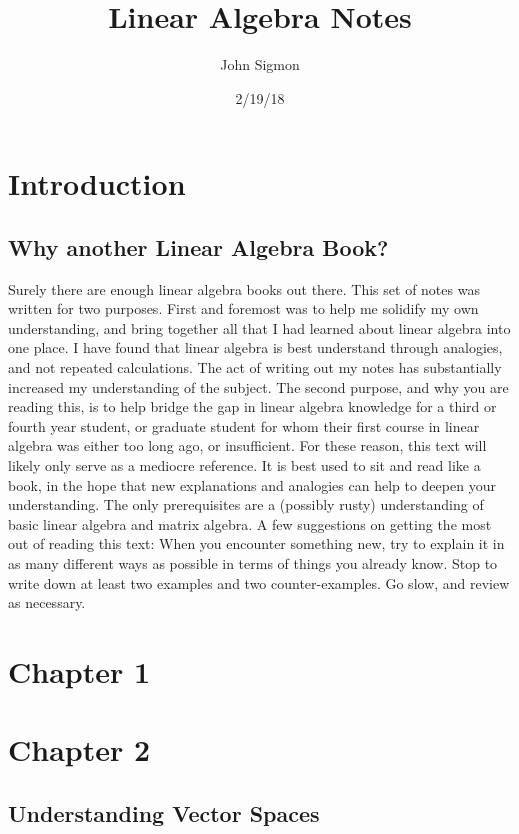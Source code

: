 \documentclass{book}
\title{Linear Algebra Notes}
\date{2/19/18}
\author{John Sigmon}
\begin{document}
\maketitle
	
\newpage
	
\tableofcontents

\chapter{Introduction}

\section{Why another Linear Algebra Book?}
		Surely there are enough linear algebra books out there. This set of notes was written for two purposes. First and foremost was to help me solidify my own understanding, and bring together all that I had learned about linear algebra into one place. I have found that linear algebra is best understand through analogies, and not repeated calculations. The act of writing out my notes has substantially increased my understanding of the subject. 
		The second purpose, and why you are reading this, is to help bridge the gap in linear algebra knowledge for a third or fourth year student, or graduate student for whom their first course in linear algebra was either too long ago, or insufficient. 
		For these reason, this text will likely only serve as a mediocre reference. It is best used to sit and read like a book, in the hope that new explanations and analogies can help to deepen your understanding. The only prerequisites are a (possibly rusty) understanding of basic linear algebra and matrix algebra.
		A few suggestions on getting the most out of reading this text:
		When you encounter something new, try to explain it in as many different ways as possible in terms of things you already know. 
		Stop to write down at least two examples and two counter-examples.
		Go slow, and review as necessary.


\chapter{Chapter 1}
	
\chapter{Chapter 2}
\section{Understanding Vector Spaces}
\end{document}
